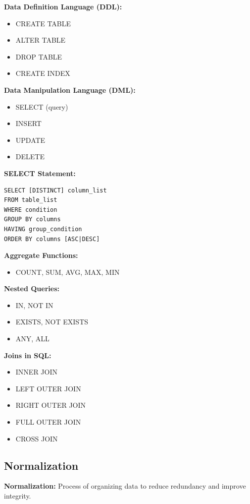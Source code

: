 \documentclass[11pt,a4paper]{article}
\begin{document}
\textbf{Data Definition Language (DDL):}
\begin{itemize}
    \item CREATE TABLE
    \item ALTER TABLE
    \item DROP TABLE
    \item CREATE INDEX
\end{itemize}

\textbf{Data Manipulation Language (DML):}
\begin{itemize}
    \item SELECT (query)
    \item INSERT
    \item UPDATE
    \item DELETE
\end{itemize}

\textbf{SELECT Statement:}
\begin{verbatim}
SELECT [DISTINCT] column_list
FROM table_list
WHERE condition
GROUP BY columns
HAVING group_condition
ORDER BY columns [ASC|DESC]
\end{verbatim}

\textbf{Aggregate Functions:}
\begin{itemize}
    \item COUNT, SUM, AVG, MAX, MIN
\end{itemize}

\textbf{Nested Queries:}
\begin{itemize}
    \item IN, NOT IN
    \item EXISTS, NOT EXISTS
    \item ANY, ALL
\end{itemize}

\textbf{Joins in SQL:}
\begin{itemize}
    \item INNER JOIN
    \item LEFT OUTER JOIN
    \item RIGHT OUTER JOIN
    \item FULL OUTER JOIN
    \item CROSS JOIN
\end{itemize}

\subsection{Normalization}

\begin{defbox}
\textbf{Normalization:} Process of organizing data to reduce redundancy and improve integrity.
\end{defbox}
\end{document}
